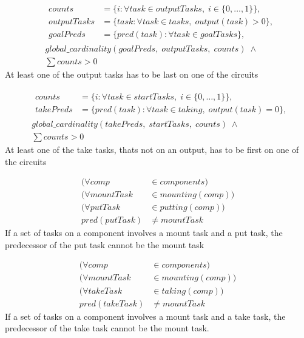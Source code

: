  \begin{equation}
 \begin{aligned}\label{eq:82}
 &\begin{aligned}
 counts &= \{i : \forall task \in outputTasks, \; i \in \{0 , \ldots , 1\}\}, \\
 outputTasks &= \{task : \forall task \in tasks, \; output(task) > 0\}, \\
 goalPreds &= \{pred(task) : \forall task \in goalTasks\},
 \end{aligned} \\
 &global\_cardinality(goalPreds, \; outputTasks, \; counts) \; \land\\
 &\sum counts > 0
 \end{aligned}
 \end{equation}
 At least one of the output tasks has to be last on one of the circuits
 
 
 \begin{equation}
 \begin{aligned}\label{eq:83}
 &\begin{aligned}
 counts &= \{i : \forall task \in startTasks, \; i \in \{0 , \ldots , 1\}\}, \\
 takePreds &= \{pred(task) : \forall task \in taking, \; output(task) = 0\}, 
 \end{aligned}\\
 &global\_cardinality(takePreds, \; startTasks, \; counts) \; \land\\
 &\sum counts > 0
 \end{aligned}
 \end{equation}
 At least one of the take tasks, thats not on an output, has to be first on one of the circuits
 
 
 \begin{equation}
 \begin{aligned}\label{eq:84}
 (\forall comp &\in components) \\
 (\forall mountTask &\in mounting(comp)) \\
 (\forall putTask &\in putting(comp)) \\
 pred(putTask) &\neq mountTask
 \end{aligned}
 \end{equation}
 If a set of tasks on a component involves a mount task and a put task, the predecessor of the put task cannot be the mount task
 
 
 \begin{equation}
 \begin{aligned}\label{eq:85}
 (\forall comp &\in components) \\
 (\forall mountTask &\in mounting(comp)) \\
 (\forall takeTask &\in taking(comp)) \\
 pred(takeTask) &\neq mountTask
 \end{aligned}
 \end{equation}
 If a set of tasks on a component involves a mount task and a take task, the predecessor of the take task cannot be the mount task.
 
